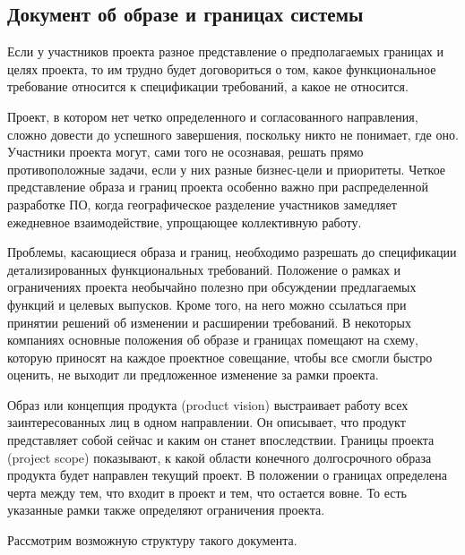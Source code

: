 \documentclass{../../text-style}
\begin{document}
\subsection{Документ об образе и границах системы}

Если у участников проекта разное представление о предполагаемых границах и целях проекта, то им трудно будет договориться о том, какое функциональное требование относится к спецификации требований, а какое не относится.

Проект, в котором нет четко определенного и согласованного направления, сложно довести до успешного завершения, поскольку никто не понимает, где оно.
Участники проекта могут, сами того не осознавая, решать прямо противоположные задачи, если у них разные бизнес-цели и приоритеты.
Четкое представление образа и границ проекта особенно важно при распределенной разработке ПО, когда географическое разделение участников замедляет ежедневное взаимодействие, упрощающее коллективную работу.

Проблемы, касающиеся образа и границ, необходимо разрешать до спецификации детализированных функциональных требований.
Положение о рамках и ограничениях проекта необычайно полезно при обсуждении предлагаемых функций и целевых выпусков.
Кроме того, на него можно ссылаться при принятии решений об изменении и расширении требований.
В некоторых компаниях основные положения об образе и границах помещают на схему, которую приносят на каждое проектное совещание, чтобы все смогли быстро оценить, не выходит ли предложенное изменение за рамки проекта.

Образ или концепция продукта (product vision) выстраивает работу всех заинтересованных лиц в одном направлении.
Он описывает, что продукт представляет собой сейчас и каким он станет впоследствии.
Границы проекта (project scope) показывают, к какой области конечного долгосрочного образа продукта будет направлен текущий проект.
В положении о границах определена черта между тем, что входит в проект и тем, что остается вовне.
То есть указанные рамки также определяют ограничения проекта.

Рассмотрим возможную структуру такого документа.
\end{document}
